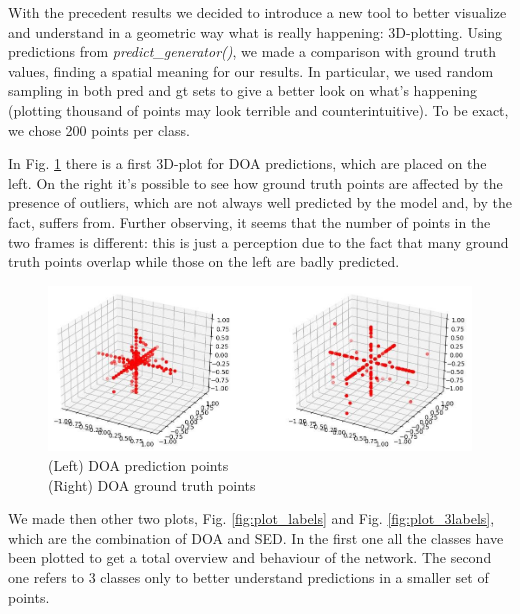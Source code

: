 \documentclass[11pt]{article}
\begin{document}
\newpage
\noindent
With the precedent results we decided to introduce a new tool to better visualize and understand in a geometric way what is really happening: 3D-plotting. Using predictions from \textit{predict\_generator()}, we made a comparison with ground truth values, finding a spatial meaning for our results. In particular, we used random sampling in both pred and gt sets to give a better look on what's happening (plotting thousand of points may look terrible and counterintuitive). To be exact, we chose 200 points per class.

\noindent
In Fig. \ref{fig:plot_doa} there is a first 3D-plot for DOA predictions, which are placed on the left. On the right it's possible to see how ground truth points are affected by the presence of outliers, which are not always well predicted by the model and, by the fact, suffers from. Further observing, it seems that the number of points in the two frames is different: this is just a perception due to the fact that many ground truth points overlap while those on the left are badly predicted.

\begin{figure}[h!]
	\centering
	\hspace*{-2.5cm}
	\includegraphics[width=17.7cm]{img/plot_doa.jpg}
	\caption{(Left) DOA prediction points \\ \hspace{1cm} (Right) DOA ground truth points}
	\label{fig:plot_doa}
\end{figure}

\noindent
We made then other two plots, Fig. \ref{fig:plot_labels} and Fig. \ref{fig:plot_3labels}, which are the combination of DOA and SED. In the first one all the classes have been plotted to get a total overview and behaviour of the network. The second one refers to 3 classes only to better understand predictions in a smaller set of points.
\end{document}
